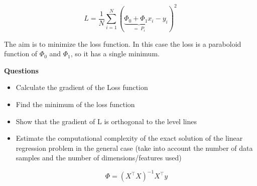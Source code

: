 $$
L = \dfrac 1N \sum_{i=1}^{N} (\underbrace{\Phi_0 + \Phi_1 x_i}_{= \ P_i} - y_i)^2
$$

The aim is to minimize the loss function. In this case the loss is a paraboloid function of $\Phi_0$ and $\Phi_1$, so it has a single minimum. 

\textbf{Questions}

\begin{itemize}
    \item Calculate the gradient of the Loss function
    \item Find the minimum of the loss function
    \item Show that the gradient of L is orthogonal to the level lines
    \item Estimate the computational complexity of the exact solution of the linear regression problem in the general case (take into account the number of data samples and the number of dimensions/features used)
    
    $$
    \Phi = (X^\top X)^{-1} X^\top y
    $$
\end{itemize}


